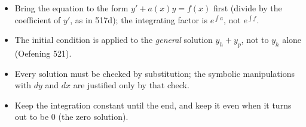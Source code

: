 \begin{warn}
\begin{itemize}
\item Bring the equation to the form $y'+a(x)y=f(x)$ first (divide by the coefficient of $y'$, as in 517d); the integrating factor is $e^{\int a}$, not $e^{\int f}$.
\item The initial condition is applied to the \emph{general} solution $y_h+y_p$, not to $y_h$ alone (Oefening 521).
\item Every solution must be checked by substitution; the symbolic manipulations with $dy$ and $dx$ are justified only by that check.
\item Keep the integration constant until the end, and keep it even when it turns out to be $0$ (the zero solution).
\end{itemize}
\end{warn}
